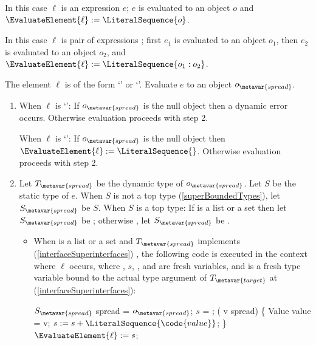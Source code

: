 \documentclass[makeidx]{article}
\begin{document}
{\LMHash{}%
In this case $\ell$ is an expression $e$;
$e$ is evaluated to an object $o$
and $\EvaluateElement{\ell} := \LiteralSequence{o}$.
\EndCase

\LMHash{}%
In this case $\ell$ is pair of expressions
;
first $e_1$ is evaluated to an object $o_1$,
then $e_2$ is evaluated to an object $o_2$,
and $\EvaluateElement{\ell} := \LiteralSequence{o_1:o_2}$.
\EndCase

\LMHash{}%
The element $\ell$ is of the form `' or `'.
Evaluate $e$ to an object $o_{\metavar{spread}}$.

\begin{enumerate}
\item
  When $\ell$ is `':
  If $o_{\metavar{spread}}$ is the null object then a dynamic error occurs.
  Otherwise evaluation proceeds with step 2.

  When $\ell$ is `':
  If $o_{\metavar{spread}}$ is the null object then
  $\EvaluateElement{\ell} := \LiteralSequence{}$.
  Otherwise evaluation proceeds with step 2.
\item
  Let $T_{\metavar{spread}}$ be the dynamic type of $o_{\metavar{spread}}$.
  Let $S$ be the static type of $e$.
  When $S$ is not a top type
  (\ref{superBoundedTypes}),
  let $S_{\metavar{spread}}$ be $S$.
  When $S$ is a top type:
  If  is a list or a set then
  let $S_{\metavar{spread}}$ be ;
  otherwise
  ,
  let $S_{\metavar{spread}}$ be .

  \begin{itemize}
  \item
    When  is a list or a set
    and $T_{\metavar{spread}}$ implements
    (\ref{interfaceSuperinterfaces})
    ,
    the following code is executed in the context where $\ell$ occurs,
    where , $s$, , and  are fresh variables,
    and  is a fresh type variable bound to the
    actual type argument of $T_{\metavar{target}}$ at 
    (\ref{interfaceSuperinterfaces}):

    \vspace{-2ex}\begin{minipage}[t]{\textwidth}
\begin{normativeDartCode}
$S_{\metavar{spread}}$ spread = $o_{\metavar{spread}}$;
\VAR{} $s$ = \LiteralSequence;
\FOR{} (\VAR{} v \IN{} spread) \{
  Value value = v;
  $s := s + \LiteralSequence{\code{value}}$;
\}
$\EvaluateElement{\ell} := s$;
\end{normativeDartCode}
    \end{minipage}


\end{itemize}
\end{enumerate}}
\end{document}

